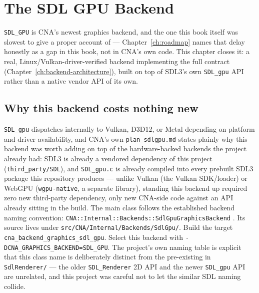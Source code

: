 \chapter{The SDL GPU Backend}
\label{ch:sdlgpu-backend}

\texttt{SDL\_GPU} is CNA's newest graphics backend, and the one this book itself was slowest
to give a proper account of --- Chapter~\ref{ch:roadmap} names that delay honestly as a gap in
this book, not in CNA's own code. This chapter closes it: a real, Linux/Vulkan-driver-verified
backend implementing the full  contract
(Chapter~\ref{ch:backend-architecture}), built on top of SDL3's own \texttt{SDL\_gpu} API
rather than a native vendor API of its own.

\section{Why this backend costs nothing new}

\texttt{SDL\_gpu} dispatches internally to Vulkan, D3D12, or Metal depending on platform and
driver availability, and CNA's own \texttt{plan\_sdlgpu.md} states plainly why this backend was
worth adding on top of the hardware-backed backends the project already had: SDL3 is
already a vendored dependency of this project (\texttt{third\_party/SDL}), and
\texttt{SDL\_gpu.c} is already compiled into every prebuilt SDL3 package this repository
produces --- unlike Vulkan (the Vulkan SDK/loader) or WebGPU (\texttt{wgpu-native}, a separate
library), standing this backend up required zero new third-party dependency, only new CNA-side
code against an API already sitting in the build. The main class follows the established backend
naming convention: \texttt{CNA::\allowbreak{}Internal::\allowbreak{}Backends::\allowbreak{}SdlGpuGraphicsBackend}
. Its source lives under
\texttt{src/\allowbreak{}CNA/\allowbreak{}Internal/\allowbreak{}Backends/\allowbreak{}SdlGpu/}. Build the target
\texttt{cna\_\allowbreak{}backend\_\allowbreak{}graphics\_\allowbreak{}sdl\_\allowbreak{}gpu}. Select this backend with
\texttt{-DCNA\_\allowbreak{}GRAPHICS\_\allowbreak{}BACKEND=SDL\_\allowbreak{}GPU}.
The project's own naming table is explicit that this class name is deliberately distinct from
the pre-existing  in \texttt{SdlRenderer/} --- the older
\texttt{SDL\_Renderer} 2D API and the newer \texttt{SDL\_gpu} API are unrelated, and this project
was careful not to let the similar SDL naming collide.

